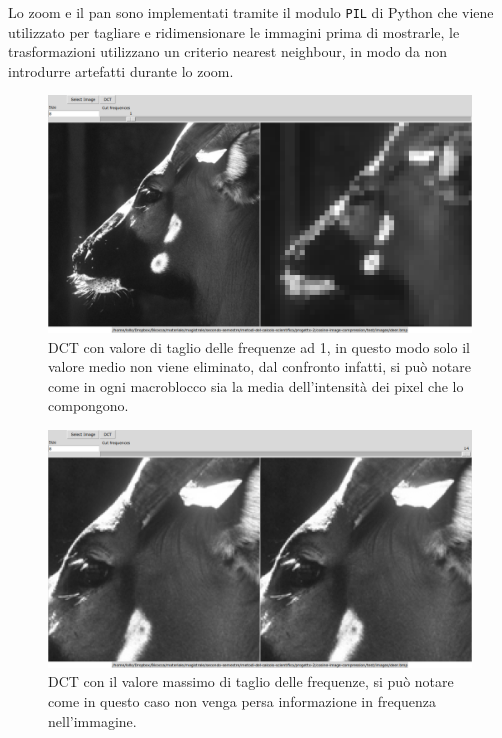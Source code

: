 \documentclass[a4paper, 12pt]{article}
\begin{document}
Lo zoom e il pan sono implementati tramite il modulo \texttt{PIL} di Python che
viene utilizzato per tagliare e ridimensionare le immagini prima di mostrarle, 
le trasformazioni utilizzano un criterio nearest neighbour, in modo da non 
introdurre artefatti durante lo zoom.


\begin{figure}[h]
  \centering
  \includegraphics[width=\textwidth]{./imgs/deer-1.png}
  \caption{DCT con valore di taglio delle frequenze ad 1, in questo modo solo
    il valore medio non viene eliminato, dal confronto infatti, si può notare
    come in ogni macroblocco sia la media dell'intensità dei pixel che lo
    compongono.}
  \label{fig:deer-1}
\end{figure}


\begin{figure}[h]
  \centering
  \includegraphics[width=\textwidth]{./imgs/deer-full.png}
  \caption{DCT con il valore massimo di taglio delle frequenze, si può notare come in questo caso non venga persa informazione in frequenza nell'immagine.}
  \label{fig:deer-full}
\end{figure}
\end{document}
